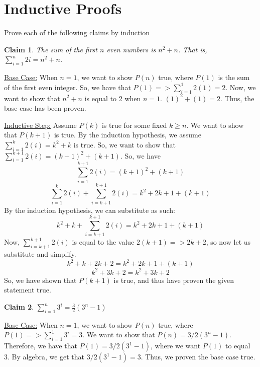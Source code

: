 \documentclass{article}
\newtheorem{claim}{Claim}
\begin{document}
    \section{Inductive Proofs}

    Prove each of the following claims by induction

    \begin{claim}
      The sum of the first $n$ even numbers is $n^2 + n$.  That is, $\sum\limits_{i=1}^{n} 2i = n^2 + n$.
    \end{claim}

    \noindent \underline{Base Case:} \newline
    When $n = 1$,  
    we want to show $P(n)$ true, where $P(1)$ is the sum of the 
    first even integer. So, we have that $P(1) => \sum_{i=1}^{1} 2(1) = 2$. 
    Now, we want to show that $n^2 + n$ is equal to 2 when $n=1$. 
    $(1)^2 + (1) = 2$. Thus, the base case has been proven. 
    \newline

    \noindent \underline{Inductive Step:} \newline
    Assume $P(k)$ is true for some fixed $k \geq n$. 
    We want to show that $P(k+1)$ is true. By the induction hypothesis, 
    we assume $\sum_{i=1}^{k} 2(i) = k^2 +k$ is true. So, we want to show
    that $\sum_{i=1}^{k+1} 2(i) = (k+1)^2 + (k+1)$. So, we have
    $$\sum_{i=1}^{k+1} 2(i) = (k+1)^2 + (k+1)$$
    $$\sum_{i=1}^{k} 2(i) + \sum_{i=k+1}^{k+1} 2(i) = k^2 +2k+1 + (k+1)$$
    By the induction hypothesis, we can substitute as such:
    $$k^2 + k + \sum_{i=k+1}^{k+1} 2(i) = k^2 +2k+1 + (k+1)$$
    Now, $\sum_{i=k+1}^{k+1} 2(i)$ is equal to the value $2(k+1) => 2k+2$, so 
    now let us substitute and simplify.
    $$k^2 + k + 2k + 2 = k^2 +2k+1 + (k+1)$$
    $$k^2 + 3k + 2 = k^2 +3k + 2$$
    So, we have shown that $P(k+1)$ is true, and thus have proven the given 
    statement true. 


    \begin{claim}
      $\sum\limits_{i=1}^{n} 3^i = \frac{3}{2}(3^n-1)$
    \end{claim}

    \noindent \underline{Base Case:} \newline
    When $n = 1$, we want to show $P(n)$ true, where $P(1) => \sum_{i=1}^{1} 3^i = 3$.
    We want to show that $P(n) = 3/2(3^n - 1)$. Therefore, we have that $P(1) = 3/2(3^1 - 1)$, 
    where we want $P(1)$ to equal 3. By algebra, we get that $3/2(3^1 - 1) = 3$. Thus, we
    proven the base case true. 
    \newline
\end{document}
